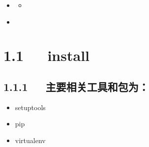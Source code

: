 \documentclass[letterpaper,12pt,english]{sphinxmanual}
\begin{document}
\begin{sphinxShadowBox}
\begin{itemize}
\begin{itemize}
\begin{itemize}
\begin{itemize}
\item {} 
\label{\detokenize{001software/001install/python:id14}}{\hyperref[\detokenize{001software/001install/python:id4}]{}}

\item {} 
\label{\detokenize{001software/001install/python:id15}}{\hyperref[\detokenize{001software/001install/python:id5}]{}}

\end{itemize}

\item {} 
\label{\detokenize{001software/001install/python:id16}}{\hyperref[\detokenize{001software/001install/python:virtualenv}]{}}

\end{itemize}

\item {} 
\label{\detokenize{001software/001install/python:id17}}{\hyperref[\detokenize{001software/001install/python:web}]{}}
\begin{itemize}
\item {} 
\label{\detokenize{001software/001install/python:id18}}{\hyperref[\detokenize{001software/001install/python:website}]{}}

\end{itemize}

\item {} 
\label{\detokenize{001software/001install/python:id19}}{\hyperref[\detokenize{001software/001install/python:package}]{}}

\end{itemize}

\end{itemize}
\end{sphinxShadowBox}


\section{1.1   install}
\label{\detokenize{001software/001install/python:install}}

\subsection{1.1.1   主要相关工具和包为：}
\label{\detokenize{001software/001install/python:id2}}\begin{itemize}
\item {} 
setuptools

\item {} 
pip

\item {} 
virtualenv

\end{itemize}
\end{document}

